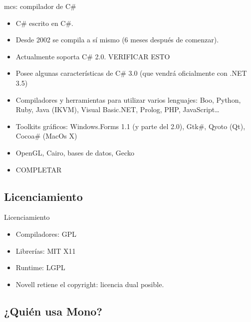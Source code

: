 \documentclass{beamer}
\begin{document}
\begin{frame}{mcs: compilador de C\#}
  \begin{itemize}
    \item C\# escrito en C\#.
    \item Desde 2002 se compila a sí mismo (6 meses después de comenzar).
    \item Actualmente soporta C\# 2.0. VERIFICAR ESTO
    \item Posee algunas características de C\# 3.0 (que vendrá oficialmente con .NET 3.5)
  \end{itemize}
\end{frame}

\begin{frame}
  \begin{itemize}
    \item Compiladores y herramientas para utilizar varios lenguajes: Boo,
      Python, Ruby, Java (\alert{IKVM}), Visual Basic.NET, Prolog, PHP, JavaScript\ldots
    \item Toolkits gráficos: Windows.Forms 1.1 (y parte del 2.0), Gtk\#, Qyoto (Qt), Cocoa\# (MacOs X)
    \item OpenGL, Cairo, bases de datos, Gecko
    \item COMPLETAR
  \end{itemize}
\end{frame}


\subsection{Licenciamiento}

\begin{frame}{Licenciamiento}
  \begin{itemize}
    \item Compiladores: GPL
    \item Librerías: MIT X11
    \item Runtime: LGPL
    \item Novell retiene el copyright: licencia dual posible.
  \end{itemize}
\end{frame}


\subsection{¿Quién usa Mono?}
\end{document}
